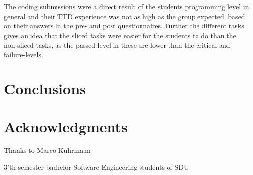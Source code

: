 \documentclass{sig-alternate-05-2015}
\begin{document}
The coding submissions were a direct result of the students programming level in general and their TTD experience was not as high as the group expected, based on their answers in the pre- and post questionnaires. Further the different tasks gives an idea that the sliced tasks were easier for the students to do than the non-sliced tasks, as the passed-level in these are lower than the critical and failure-levels.

\section{Conclusions}

\section{Acknowledgments}

Thanks to Marco Kuhrmann

3'th semester bachelor Software Engineering students of SDU
\end{document}
